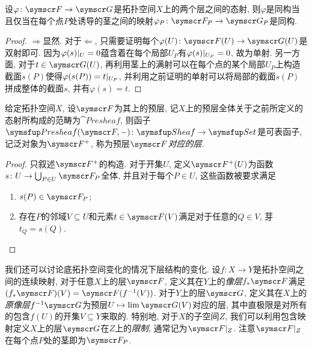 \begin{proposition}
  设$\varphi\colon \sheaf{F}\to\sheaf{G}$是拓扑空间$X$上的两个层之间的态射, 则$\varphi$是同构当且仅当在每个点$P$处诱导的茎之间的映射$\varphi_P\colon \sheaf{F}_P\to\sheaf{G}_P$是同构.
\end{proposition}

\begin{proof}
  $\Rightarrow$显然. 对于$\Leftarrow$, 只需要证明每个$\varphi (U)\colon \sheaf{F}(U)\to\sheaf{G}(U)$是双射即可. 因为$\varphi(s)\vert_{U}=0$蕴含着在每个局部$U_P$有$\varphi(s)\vert_{U_P}=0$, 故为单射. 另一方面, 对于$t\in \sheaf{G}(U)$, 再利用茎上的满射可以在每个点的某个局部$U_P$上构造截面$s(P)$使得$\varphi(s(P))=t\vert_{U_P}$, 并利用之前证明的单射可以将局部的截面$s(P)$拼成整体的截面$s$, 并有$\varphi(s)=t$.
\end{proof}

\begin{proposition}
  给定拓扑空间$X$, 设$\sheaf{F}$为其上的预层, 记$X$上的预层全体关于之前所定义的态射所构成的范畴为$\cat{Presheaf}$, 则函子$\cat{Presheaf}(\sheaf{F}, -)\colon \cat{Sheaf}\to \cat{Set}$是可表函子, 记泛对象为$\sheaf{F}^+$, 称为预层$\sheaf{F}$\emph{对应的层}.
\end{proposition}

\begin{proof}
  只叙述$\sheaf{F}^+$的构造. 对于开集$U$, 定义$\sheaf{F}^+(U)$为函数$s\colon U\to \bigcup_{P\in U}\sheaf{F}_P$全体, 并且对于每个$P\in U$, 这些函数被要求满足
  \begin{enumerate}
    \item $s(P)\in\sheaf{F}_P$;
    \item 存在$P$的邻域$V\subseteq U$和元素$t\in \sheaf{F}(V)$满足对于任意的$Q\in V$, 芽$t_Q=s(Q)$.
  \end{enumerate}
\end{proof}

我们还可以讨论底拓扑空间变化的情况下层结构的变化. 设$f\colon X\to Y$是拓扑空间之间的连续映射, 对于任意$X$上的层$\sheaf{F}$, 定义其在$Y$上的\emph{像层}$f_*\sheaf{F}$满足$(f_*\sheaf{F})(V)=\sheaf{F}(f^{-1}(V))$. 对于$Y$上的层$\sheaf{G}$, 定义其在$X$上的\emph{原像层}$f^{-1}\sheaf{G}$为预层$U\mapsto\dlim \sheaf{G}(V)$对应的层, 其中直极限是对所有的包含$f(U)$的开集$V\subseteq Y$来取的. 特别地, 对于$X$的子空间$Z$, 我们可以利用包含映射定义$X$上的层$\sheaf{G}$在$Z$上的\emph{限制}, 通常记为$\sheaf{F}\restrict{Z}$. 注意$\sheaf{F}\restrict{Z}$在每个点$P$处的茎即为$\sheaf{F}_P$.

